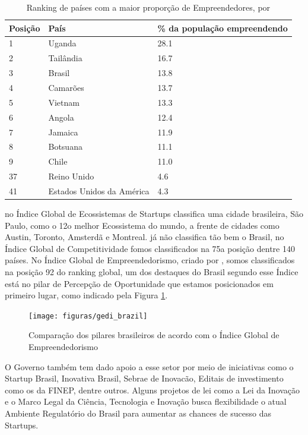 \begin{table}[!htb]
	\centering
	\begin{tabular}{ | p{3cm} | p{8cm} | p{4cm} | }
		\hline
		Posição & País & \% da população empreendendo \\ \hline
		1 & Uganda & 28.1 \\ \hline
		2 & Tailândia & 16.7 \\ \hline
		3 & Brasil & 13.8 \\ \hline
		4 & Camarões & 13.7 \\ \hline
		5 & Vietnam & 13.3 \\ \hline
		6 & Angola & 12.4 \\ \hline
		7 & Jamaica & 11.9 \\ \hline
		8 & Botsuana & 11.1 \\ \hline
		9 & Chile & 11.0 \\ \hline
		37 & Reino Unido & 4.6 \\ \hline
		41 & Estados Unidos da América & 4.3 \\ \hline
	\end{tabular}
	\caption{Ranking de países com a maior proporção de Empreendedores, por \cite{Brinded2015}}	\label{table:ranking_de_paises_com_mais_empreendedores}
\end{table}

 no Índice Global de Ecossistemas de Startups classifica uma cidade brasileira, São Paulo, como o 12o melhor Ecossistema do mundo, a frente de cidades como Austin, Toronto, Amsterdã e Montreal.  já não classifica tão bem o Brasil, no Índice Global de Competitividade fomos classificados na 75a posição dentre 140 países. No Índice Global de Empreendedorismo, criado por , somos classificados na posição 92 do ranking global, um dos destaques do Brasil segundo esse Índice está no pilar de Percepção de Oportunidade que estamos posicionados em primeiro lugar, como indicado pela Figura \ref{figure:gedi_brazil}.

\begin{figure}[!htb]
	\centering
	\texttt{[image: figuras/gedi\_brazil]}
	\caption{Comparação dos pilares brasileiros de acordo com o Índice Global de Empreendedorismo}
	\label{figure:gedi_brazil}
\end{figure}

O Governo também tem dado apoio a esse setor por meio de iniciativas como o Startup Brasil, Inovativa Brasil, Sebrae de Inovacão, Editais de investimento como os da FINEP, dentre outros. Alguns projetos de lei como a Lei da Inovação e o Marco Legal da Ciência, Tecnologia e Inovação busca flexibilidade o atual Ambiente Regulatório do Brasil para aumentar as chances de sucesso das Startups. 

